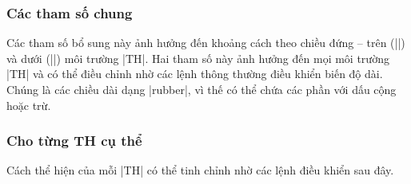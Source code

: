 \documentclass[11pt,oneside]{ltxdoc}
\theoremstyle{marginbreak}
\theoremstyle{changebreak}
\theoremstyle{change}
\theoremstyle{plain}
\theoremstyle{nonumberplain}
\begin{document}

\subsubsection{Các tham số chung}

\DescribeMacro\theorempreskipamount
\DescribeMacro\theorempostskipamount 
Các tham số bổ sung này ảnh hưởng đến khoảng cách theo chiều đứng --
trên (|\theorempreskipamount|) và dưới (|\theorempostskipamount|) môi trường |TH|.
Hai tham số này ảnh hưởng đến mọi môi trường |TH| và có thể điều chỉnh
nhờ các lệnh thông thường điều khiển biến độ dài. Chúng là các chiều dài
dạng |rubber|, vì thế có thể chứa các phần với dấu cộng hoặc trừ.

\subsubsection{Cho từng TH cụ thể}

Cách thể hiện của mỗi |TH| có thể tinh chỉnh nhờ các lệnh điều khiển sau đây.
\end{document}
